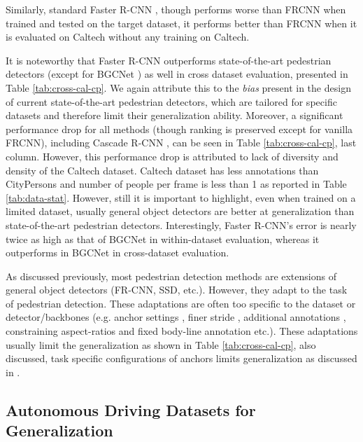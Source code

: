 \documentclass[final]{cvpr}
\newcommand{\caltecha}[1]{{Caltech}}
\newcommand{\citypersona}[1]{{CityPersons}}
\begin{document}
Similarly, standard Faster R-CNN \cite{ren2015faster}, though performs worse than FRCNN \cite{zhang2017citypersons} when trained and tested on the target dataset, it performs better than FRCNN \cite{zhang2017citypersons} when it is evaluated on \caltecha{} without any training on \caltecha{}.

It is noteworthy that Faster R-CNN \cite{ren2015faster} outperforms state-of-the-art pedestrian detectors (except for BGCNet \cite{li2020box}) as well in cross dataset evaluation, presented in Table \ref{tab:cross-cal-cp}. 
We again attribute this to the \emph{bias} present in the design of current state-of-the-art pedestrian detectors, which are tailored for specific datasets and therefore limit their generalization ability. 
Moreover, a significant performance drop for all methods (though ranking is preserved except for vanilla FRCNN), including Cascade R-CNN \cite{cai2019cascade}, can be seen in Table \ref{tab:cross-cal-cp}, last column. However, this performance drop is attributed to lack of diversity and density of the \caltecha{} dataset. \caltecha{} dataset has less annotations than \citypersona{} and number of people per frame is less than 1 as reported in Table \ref{tab:data-stat}. However, still it is important to highlight, even when trained on a limited dataset, usually general object detectors are better at generalization than state-of-the-art pedestrian detectors. Interestingly, Faster R-CNN's \cite{ren2015faster} error is nearly twice as high as that of BGCNet \cite{li2020box} in within-dataset evaluation, whereas it outperforms in BGCNet \cite{li2020box} in cross-dataset evaluation.

As discussed previously, most pedestrian detection methods are extensions of general object detectors (FR-CNN, SSD, etc.). However, they adapt to the task of pedestrian detection. 
These adaptations are often too specific to the dataset or detector/backbones (e.g. anchor settings \cite{zhang2017citypersons, liu2018learning}, finer stride \cite{zhang2017citypersons}, additional annotations \cite{zhou2018bi,pang2019maskguided}, constraining aspect-ratios and fixed body-line annotation \cite{Liu2018DBC,li2020box} etc.). These adaptations usually limit the generalization as shown in Table \ref{tab:cross-cal-cp}, also discussed, task specific configurations of anchors limits generalization as discussed in \cite{liu2019center}.






\subsection{Autonomous Driving Datasets for Generalization} \label{gen:ad}
\end{document}
